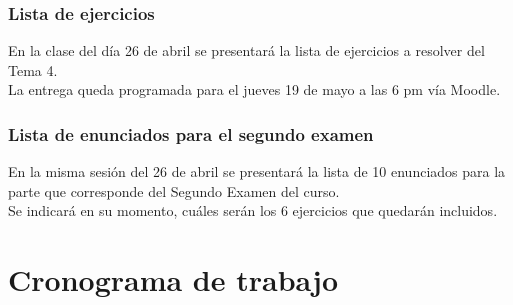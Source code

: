 \documentclass[12pt]{beamer}
\begin{document}
\begin{frame}
\frametitle{Lista de ejercicios}
En la clase del día 26 de abril se presentará la lista de ejercicios a resolver del Tema 4.
\\
\bigskip
\pause
La entrega queda programada para el jueves 19 de mayo a las 6 pm vía Moodle.
\end{frame}
\begin{frame}
\frametitle{Lista de enunciados para el segundo examen}
En la misma sesión del 26 de abril se presentará la lista de 10 enunciados para la parte que corresponde del Segundo Examen del curso.
\\
\bigskip
\pause
Se indicará en su momento, cuáles serán los 6 ejercicios que quedarán incluidos.
\end{frame}




\section{Cronograma de trabajo}
\end{document}
